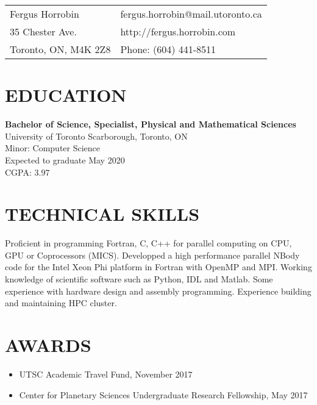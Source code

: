 \documentclass[line, margin]{res}
\begin{document}

\linespread{1.5}

\begin{resume}
\begin{tabular}{l l}
 Fergus Horrobin          & \hspace{1in} fergus.horrobin@mail.utoronto.ca \\
 35 Chester Ave.          & \hspace{1in} http://fergus.horrobin.com   \\
 Toronto, ON, M4K 2Z8     & \hspace{1in} Phone: (604) 441-8511 \\
\end{tabular}


\vspace{1em}


  \section{EDUCATION}
    \textbf{Bachelor of Science, Specialist, Physical and Mathematical Sciences} \\ 
    University of Toronto Scarborough, Toronto, ON \\
    Minor: Computer Science \\
    Expected to graduate May 2020 \\
    CGPA: 3.97

  \section{TECHNICAL SKILLS}
    Proficient in programming Fortran, C, C++ for parallel computing on CPU, GPU or Coprocessors (MICS).
    Developped a high performance parallel NBody code for the Intel Xeon Phi platform in Fortran with OpenMP and MPI.
    Working knowledge of scientific software such as Python, IDL and Matlab. Some experience with hardware
    design and assembly programming. Experience building and maintaining HPC cluster.

  \section{AWARDS}
   \begin{itemize}
      \item UTSC Academic Travel Fund, November 2017
      \item Center for Planetary Sciences Undergraduate Research Fellowship, May 2017
    \end{itemize}
 

\end{resume}
\end{document}
